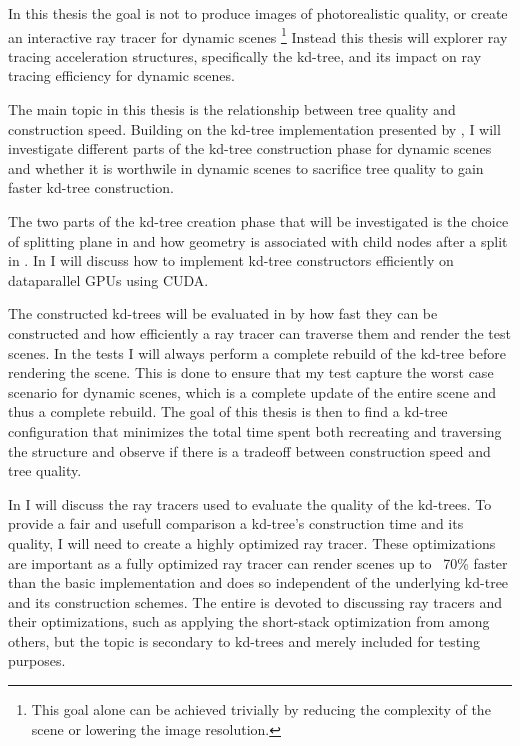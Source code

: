 In this thesis the goal is not to produce images of photorealistic quality, or
create an interactive ray tracer for dynamic scenes \footnote{This goal alone
  can be achieved trivially by reducing the complexity of the scene or lowering
  the image resolution.}  Instead this thesis will explorer ray tracing
acceleration structures, specifically the kd-tree, and its impact on ray tracing
efficiency for dynamic scenes. 

The main topic in this thesis is the relationship between tree quality and
construction speed. Building on the kd-tree implementation presented by \zhou{},
I will investigate different parts of the kd-tree construction phase for dynamic
scenes and whether it is worthwile in dynamic scenes to sacrifice tree quality
to gain faster kd-tree construction.

The two parts of the kd-tree creation phase that will be investigated is the
choice of splitting plane in  and how geometry is
associated with child nodes after a split in
. In  I will discuss
how to implement kd-tree constructors efficiently on dataparallel GPUs using
CUDA.

The constructed kd-trees will be evaluated in  by how
fast they can be constructed and how efficiently a ray tracer can traverse them
and render the test scenes. In the tests I will always perform a complete
rebuild of the kd-tree before rendering the scene. This is done to ensure that
my test capture the worst case scenario for dynamic scenes, which is a complete
update of the entire scene and thus a complete rebuild. The goal of this thesis
is then to find a kd-tree configuration that minimizes the total time spent both
recreating and traversing the structure and observe if there is a tradeoff
between construction speed and tree quality.

In  I will discuss the ray tracers used to evaluate
the quality of the kd-trees. To provide a fair and usefull comparison a
kd-tree's construction time and its quality, I will need to create a highly
optimized ray tracer. These optimizations are important as a fully optimized ray
tracer can render scenes up to ~70\% faster than the basic implementation and
does so independent of the underlying kd-tree and its construction schemes. The
entire  is devoted to discussing ray tracers and
their optimizations, such as applying the short-stack optimization from \horn{}
among others, but the topic is secondary to kd-trees and merely included for
testing purposes.

